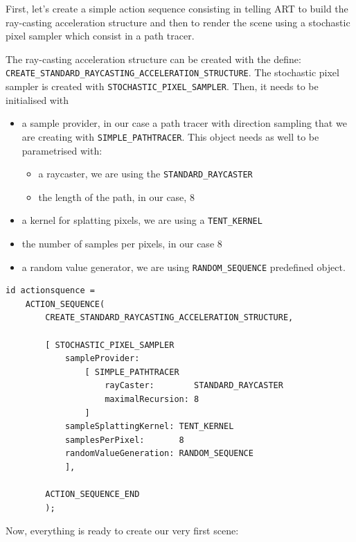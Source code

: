 \documentclass[a4paper,chapterprefix]{scrbook}
\begin{document}
First, let's create a simple action sequence consisting in telling ART to build the ray-casting acceleration structure and then to render the scene using a stochastic pixel sampler which consist in a path tracer.

The ray-casting acceleration structure can be created with the define:\\ \verb?CREATE_STANDARD_RAYCASTING_ACCELERATION_STRUCTURE?.
The stochastic pixel sampler is created with \verb?STOCHASTIC_PIXEL_SAMPLER?. Then, it needs to be initialised with 

\begin{itemize}
	\item a sample provider, in our case a path tracer with direction sampling that we are creating with \verb?SIMPLE_PATHTRACER?. This object needs as well to be parametrised with:
	\begin{itemize}
		\item a raycaster, we are using the \verb?STANDARD_RAYCASTER?
		\item the length of the path, in our case, 8
	\end{itemize}
	\item a kernel for splatting pixels, we are using a \verb?TENT_KERNEL?
	\item the number of samples per pixels, in our case 8
	\item a random value generator, we are using \verb?RANDOM_SEQUENCE? predefined object.
\end{itemize}

\begin{lstlisting}
id actionsquence = 
    ACTION_SEQUENCE(
        CREATE_STANDARD_RAYCASTING_ACCELERATION_STRUCTURE,

        [ STOCHASTIC_PIXEL_SAMPLER
            sampleProvider:
                [ SIMPLE_PATHTRACER
                    rayCaster:        STANDARD_RAYCASTER
                    maximalRecursion: 8
                ]
            sampleSplattingKernel: TENT_KERNEL
            samplesPerPixel:       8
            randomValueGeneration: RANDOM_SEQUENCE
            ],

        ACTION_SEQUENCE_END
        );
\end{lstlisting}

Now, everything is ready to create our very first scene:
\end{document}
